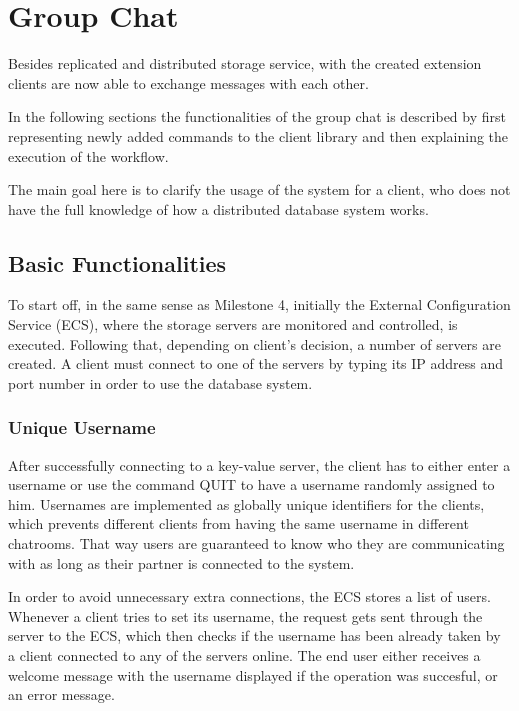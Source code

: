 \section{Group Chat}
\label{sec:groupchat}

Besides replicated and distributed storage service, with the created extension clients are now able to exchange messages with each other.

In the following sections the functionalities of the group chat is described by first representing newly added commands to the client library and then explaining the execution of the workflow.

The main goal here is to clarify the usage of the system for a client, who does not have the full knowledge of how a distributed database system works.

\subsection{Basic Functionalities}
\label{sec:groupchat_executionoftheworkflow}

To start off, in the same sense as Milestone 4, initially the External Configuration Service (ECS), where the storage servers are monitored and controlled, is executed. Following that, depending on client's decision, a number of servers are created. A client must connect to one of the servers by typing its IP address and port number in order to use the database system.

\subsubsection{Unique Username}
\label{sec:groupchat_executionoftheworkflow_uniqueusername}
After successfully connecting to a key-value server, the client has to either enter a username or use the command QUIT to have a username randomly assigned to him. Usernames are implemented as globally unique identifiers for the clients, which prevents different clients from having the same username in different chatrooms. That way users are guaranteed to know who they are communicating with as long as their partner is connected to the system. 

In order to avoid unnecessary extra connections, the ECS stores a list of users. Whenever a client tries to set its username, the request gets sent through the server to the ECS, which then checks if the username has been already taken by a client connected to any of the servers online. The end user either receives a welcome message with the username displayed if the operation was succesful, or an error message.
 
